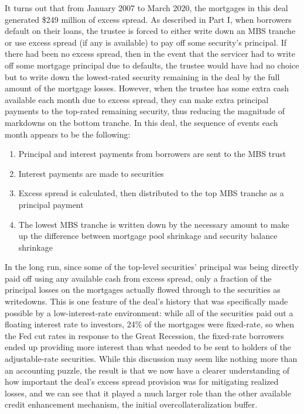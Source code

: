 \documentclass[12pt]{article}
\begin{document}
It turns out that from January 2007 to March 2020, the mortgages in this deal generated \$249 million of excess spread. As described in Part I, when borrowers default on their loans, the trustee is forced to either write down an MBS tranche or use excess spread (if any is available) to pay off some security's principal. If there had been no excess spread, then in the event that the servicer had to write off some mortgage principal due to defaults, the trustee would have had no choice but to write down the lowest-rated security remaining in the deal by the full amount of the mortgage losses. However, when the trustee has some extra cash available each month due to excess spread, they can make extra principal payments to the top-rated remaining security, thus reducing the magnitude of markdowns on the bottom tranche. In this deal, the sequence of events each month appears to be the following:

\begin{enumerate}
	\item Principal and interest payments from borrowers are sent to the MBS trust
	\item Interest payments are made to securities
	\item Excess spread is calculated, then distributed to the top MBS tranche as a principal payment
	\item The lowest MBS tranche is written down by the necessary amount to make up the difference between mortgage pool shrinkage and security balance shrinkage
\end{enumerate}

In the long run, since some of the top-level securities’ principal was being directly paid off using any available cash from excess spread, only a fraction of the principal losses on the mortgages actually flowed through to the securities as writedowns. This is one feature of the deal’s history that was specifically made possible by a low-interest-rate environment: while all of the securities paid out a floating interest rate to investors, 24\% of the mortgages were fixed-rate, so when the Fed cut rates in response to the Great Recession, the fixed-rate borrowers ended up providing more interest than what needed to be sent to holders of the adjustable-rate securities. While this discussion may seem like nothing more than an accounting puzzle, the result is that we now have a clearer understanding of how important the deal’s excess spread provision was for mitigating realized losses, and we can see that it played a much larger role than the other available credit enhancement mechanism, the initial overcollateralization buffer.
\end{document}
